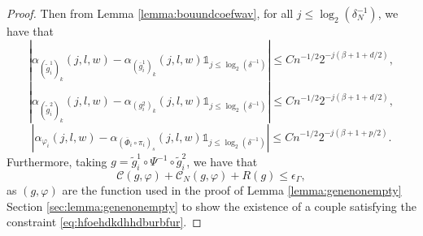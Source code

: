 \documentclass[10pt]{article}
\begin{document}
\begin{proof}
Then from Lemma \ref{lemma:bouundcoefwav}, for all $ j\leq \log_2(\delta^{-1}_N)$, we have that 
$$
|\alpha_{(\tilde{g}_i^1)_k}(j,l,w)-\alpha_{(\overline{g}_i^1)_k}(j,l,w)\mathds{1}_{j\leq \log_2(\delta^{-1})}|\leq Cn^{-1/2}2^{-j(\beta+1+d/2)},
$$
$$
|\alpha_{(\tilde{g}_i^2)_k}(j,l,w)-\alpha_{(g_i^2)_k}(j,l,w)\mathds{1}_{j\leq \log_2(\delta^{-1})}|\leq Cn^{-1/2}2^{-j(\beta+1+d/2)},
$$
$$
|\alpha_{\varphi_i}(j,l,w)-\alpha_{(\overline{\Phi}_i\circ\pi_i)_s}(j,l,w)\mathds{1}_{j\leq \log_2(\delta^{-1})}|\leq Cn^{-1/2}2^{-j(\beta+1+p/2)}.
$$
Furthermore, taking $g=\tilde{g}_i^1\circ \Psi^{-1}\circ \tilde{g}_i^2$,  we have that 
\begin{equation}\label{eq:hfoehdkdhhdburbfur}
\mathcal{C}(g,\varphi) + \mathcal{C}_N(g,\varphi) +R(g)\leq \epsilon_\Gamma,
\end{equation}
as $(g,\varphi)$ are the function used in the proof of Lemma \ref{lemma:genenonempty} Section \ref{sec:lemma:genenonempty}  to show the existence of a couple satisfying the constraint \eqref{eq:hfoehdkdhhdburbfur}.


\end{proof}
\end{document}
